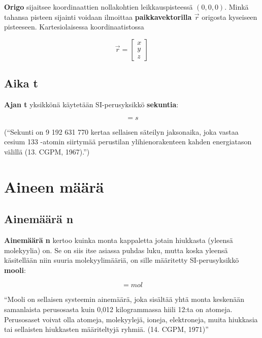 \documentclass[12pt,a4paper,finnish]{book}
\begin{document}
\textbf{Origo} sijaitsee koordinaattien nollakohtien leikkauspisteessä $(0, 0, 0)$. Minkä tahansa pisteen sijainti 
voidaan ilmoittaa \textbf{paikkavektorilla $\vec{r}$} origosta kyseiseen pisteeseen. Kartesiolaisessa koordinaatistossa

\begin{equation}
 \vec{r} = \begin{bmatrix}
            x\\ y\\ z
           \end{bmatrix}
\end{equation}

\subsection{Aika t}

\textbf{Ajan t} yksikkönä käytetään SI-perusyksikkö \textbf{sekuntia}:

\begin{equation}
 [t] = s
\end{equation}

(``Sekunti on 9 192 631 770 kertaa sellaisen säteilyn jaksonaika, joka vastaa cesium 133 -atomin siirtymää 
perustilan ylihienorakenteen kahden energiatason välillä (13. CGPM, 1967).'')


\section{Aineen määrä} %

\subsection{Ainemäärä n}

\textbf{Ainemäärä n} kertoo kuinka monta kappaletta jotain hiukkasta (yleensä molekyylia) on. Se on siis itse 
asiassa puhdas luku, mutta koska yleensä käsitellään niin suuria molekyylimääriä, on sille määritetty 
SI-perusyksikkö \textbf{mooli}:

\begin{equation}
 [n] = mol
\end{equation}

``Mooli on sellaisen systeemin ainemäärä, joka sisältää yhtä monta keskenään samanlaista perusosasta kuin 0,012 
kilogrammassa hiili 12:ta on atomeja. Perusosaset voivat olla atomeja, molekyylejä, ioneja, elektroneja,
muita hiukkasia tai sellaisten hiukkasten määriteltyjä ryhmiä. (14. CGPM, 1971)''
\end{document}
